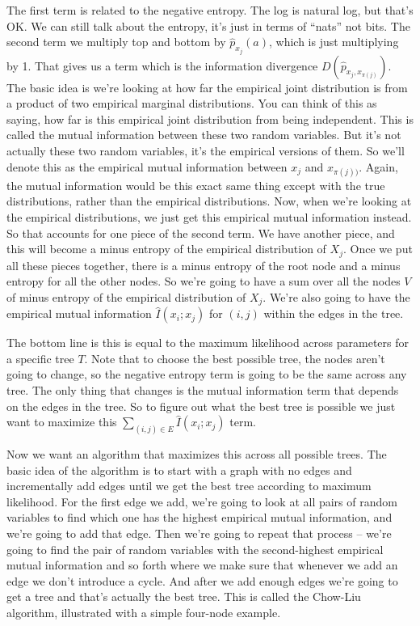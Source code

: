 The first term is related to the negative entropy. The log is natural log, but that's OK. We can still talk about the entropy, it's just in terms of ``nats'' not bits. The second term we multiply top and bottom by $\widehat{p}_{x_j}(a)$, which is just multiplying by 1. That gives us a term which is the information divergence $D(\widehat{p}_{x_j, x_{\pi(j)}})$. The basic idea is we're looking at how far the empirical joint distribution is from a product of two empirical marginal distributions. You can think of this as saying, how far is this empirical joint distribution from being independent. This is called the mutual information between these two random variables. But it's not actually these two random variables, it's the empirical versions of them. So we'll denote this as the empirical mutual information between $x_j$ and $x_{\pi(j))}$. Again, the mutual information would be this exact same thing except with the true distributions, rather than the empirical distributions. Now, when we're looking at the empirical distributions, we just get this empirical mutual information instead. So that accounts for one piece of the second term. We have another piece, and this will become a minus entropy of the empirical distribution of $X_j$. Once we put all these pieces together, there is a minus entropy of the root node and a minus entropy for all the other nodes. So we're going to have a sum over all the nodes $V$ of minus entropy of the empirical distribution of $X_j$. We're also going to have the empirical mutual information $\widehat{I}(x_i;x_j)$ for $(i, j)$ within the edges in the tree.

The bottom line is this is equal to the maximum likelihood across parameters for a specific tree $T$. Note that to choose the best possible tree, the nodes aren't going to change, so the negative entropy term is going to be the same across any tree. The only thing that changes is the mutual information term that depends on the edges in the tree. So to figure out what the best tree is possible we just want to maximize this $\sum_{(i,j) \in E} \widehat{I}(x_i;x_j)$ term. 

Now we want an algorithm that maximizes this across all possible trees. The basic idea of the algorithm is to start with a graph with no edges and incrementally add edges until we get the best tree according to maximum likelihood. For the first edge we add, we're going to look at all pairs of random variables to find which one has the highest empirical mutual information, and we're going to add that edge. Then we're going to repeat that process -- we're going to find the pair of random variables with the second-highest empirical mutual information and so forth where we make sure that whenever we add an edge we don't introduce a cycle. And after we add enough edges we're going to get a tree and that's actually the best tree. This is called the Chow-Liu algorithm, illustrated with a simple four-node example. 

